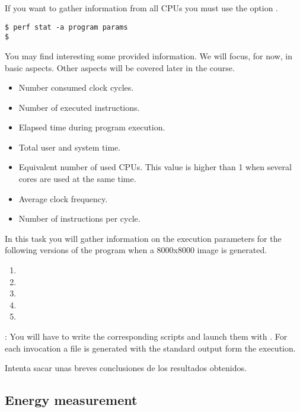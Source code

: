 If you want to gather information from all CPUs you must use the option .

\begin{lstlisting}[style=terminal]
$ perf stat -a program params
$
\end{lstlisting}

You may find interesting some provided information.
We will focus, for now, in basic aspects.
Other aspects will be covered later in the course.

\begin{itemize}
  \item Number consumed clock cycles.
  \item Number of executed instructions.
  \item Elapsed time during program execution.
  \item Total user and system time.
  \item Equivalent number of used CPUs. This value is higher than 1 when several cores are used
        at the same time.
  \item Average clock frequency.
  \item Number of instructions per cycle.
\end{itemize}

In this task you will gather information on the execution parameters for the 
following versions of the program when a 8000x8000 image is generated.

\begin{enumerate}
  \item {}
  \item {}
  \item {}
  \item {}
  \item {}
\end{enumerate}

: 
You will have to write the corresponding scripts and launch them with .
For each  invocation a  file is generated
with the standard output form the execution.

Intenta sacar unas breves conclusiones de los resultados obtenidos.

\subsection{Energy measurement}

